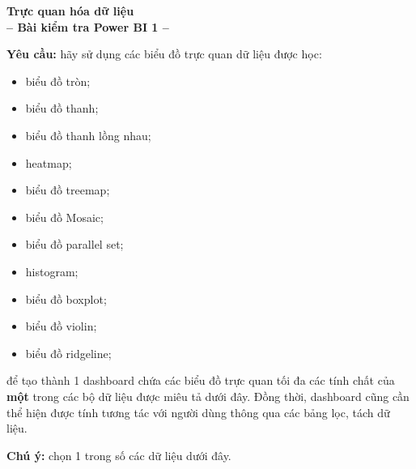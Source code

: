 \documentclass[12pt]{article}
\theoremstyle{definition} \newtheorem{exercise}[theorem]{\bf Bài tập}
\begin{document}
	
\begin{center}
	\textbf{\Large Trực quan hóa dữ liệu} \\
	\vspace{0.5cm}
	\textbf{-- Bài kiểm tra Power BI 1 --}
\end{center}

\vspace{0.5cm}

\noindent
\textbf{Yêu cầu:} hãy sử dụng các biểu đồ trực quan dữ liệu được học:
\begin{itemize}
\item biểu đồ tròn;
\item biểu đồ thanh;
\item biểu đồ thanh lồng nhau;
\item heatmap;
\item biểu đồ treemap;
\item biểu đồ Mosaic;
\item biểu đồ parallel set;
\item histogram;
\item biểu đồ boxplot;
\item biểu đồ violin;
\item biểu đồ ridgeline; 
\end{itemize}
để tạo thành 1 dashboard chứa các biểu đồ trực quan tối đa các tính chất của \textbf{một} trong các bộ dữ liệu được miêu tả dưới đây. Đồng thời, dashboard cũng cần thể hiện được tính tương tác với người dùng thông qua các bảng lọc, tách dữ liệu.

\noindent
\textbf{Chú ý:} chọn 1 trong số các dữ liệu dưới đây.
\end{document}
